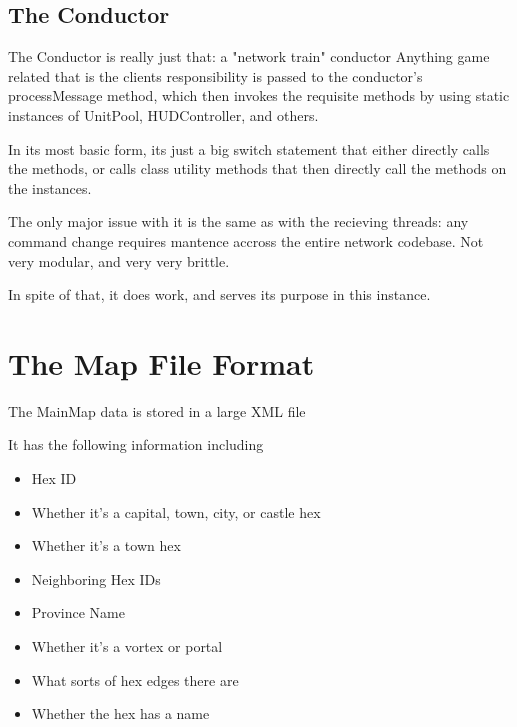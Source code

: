 \documentclass[12pt,a4paper]{article}
\begin{document}
\subsection{The Conductor}

The Conductor is really just that: a "network train" conductor
Anything game related that is the clients responsibility is passed to the conductor's processMessage method, which then invokes the requisite methods by using static instances of UnitPool, HUDController, and others. 

In its most basic form, its just a big switch statement that either directly calls the methods, or calls class utility methods that then directly call the methods on the instances.

The only major issue with it is the same as with the recieving threads: any command change requires mantence accross the entire network codebase. Not very modular, and very very brittle. 

In spite of that, it does work, and serves its purpose in this instance. 



\section{The Map File Format}
The MainMap data is stored in a large XML file

It has the following information including 

\begin{itemize}
\item{Hex ID}
\item{Whether it's a capital, town, city, or castle hex}
\item{Whether it's a town hex}
\item{Neighboring Hex IDs}
\item{Province Name}
\item{Whether it's a vortex or portal}
\item{What sorts of hex edges there are}
\item{Whether the hex has a name}
\end{itemize}

\end{document}
